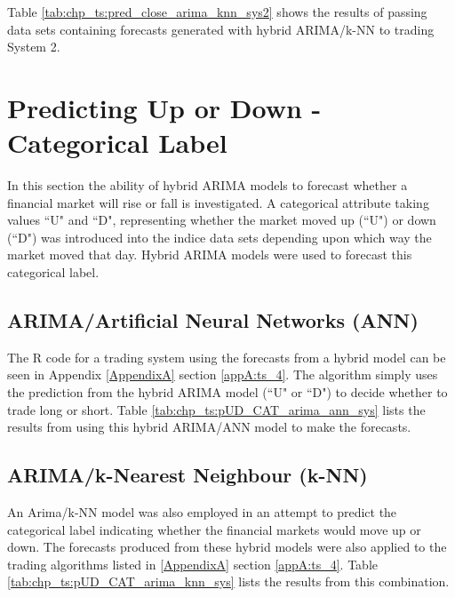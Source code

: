  Table \ref{tab:chp_ts:pred_close_arima_knn_sys2} shows the results of passing data sets containing forecasts generated with hybrid ARIMA/k-NN to trading System 2.
 



\section{Predicting Up or Down - Categorical Label}
In this section the ability of hybrid ARIMA models to forecast whether a financial market will rise or fall is investigated. A categorical attribute taking values \textquotedblleft U" and \textquotedblleft D", representing whether the market moved up (\textquotedblleft U") or down (\textquotedblleft D")  was introduced into the indice data sets depending upon which way the market moved that day. Hybrid ARIMA models were used to forecast this categorical label.

\subsection{ARIMA/Artificial Neural Networks (ANN)}
The R code for a trading system using the forecasts from a hybrid model can be seen in Appendix \ref{AppendixA} section \ref{appA:ts_4}. The algorithm simply uses the prediction from the hybrid ARIMA model (\textquotedblleft U" or \textquotedblleft D") to decide whether to trade long or short. Table \ref{tab:chp_ts:pUD_CAT_arima_ann_sys} lists the results from using this hybrid ARIMA/ANN model to make the forecasts.


\label{todo:chp5:tab:chp_ts:pUD_CAT_arima_ann_sys}



\subsection{ARIMA/k-Nearest Neighbour (k-NN)}
An Arima/k-NN model was also employed in an attempt to predict the categorical label indicating whether the financial markets would move up or down. The forecasts produced from these hybrid models were also applied to the trading algorithms listed in \ref{AppendixA} section \ref{appA:ts_4}. Table \ref{tab:chp_ts:pUD_CAT_arima_knn_sys} lists the results from this combination.

